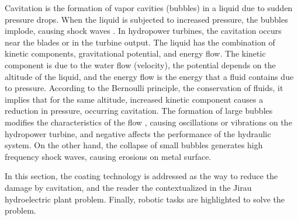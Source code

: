 Cavitation is the formation of vapor cavities (bubbles) in a liquid due to
sudden pressure drops. When the liquid is subjected to increased pressure,
the bubbles implode, causing shock waves \citep{brennen2013cavitation}. 
In hydropower turbines, the cavitation occurs near the blades or
in the turbine output. The liquid has the combination of kinetic components,
gravitational potential, and energy flow. The kinetic component is due to the
water flow (velocity), the potential depends on the altitude of the liquid, and
the energy flow is the energy that a fluid contains due to pressure. According
to the Bernoulli principle, the conservation of fluids, it implies that for
the same altitude, increased kinetic component causes a reduction in pressure,
occurring cavitation. The formation of large bubbles modifies the
characteristics of the flow , causing oscillations or vibrations on the
hydropower turbine, and negative affects the performance of the hydraulic
system. On the other hand, the collapse of small bubbles generates high
frequency shock waves, causing erosions on metal surface.


In this section, the coating technology is addressed as the way to
reduce the damage by cavitation, and the reader the contextualized in the
Jirau hydroelectric plant problem. Finally,  robotic tasks are highlighted to
solve the problem.


